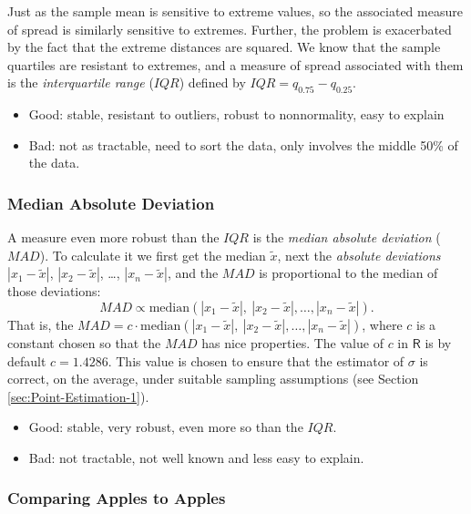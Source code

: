 \documentclass[captions=tableheading]{scrbook}
\begin{document}
Just as the sample mean is sensitive to extreme values, so the associated measure of spread is similarly sensitive to extremes. Further, the problem is exacerbated by the fact that the extreme distances are squared. We know that the sample quartiles are resistant to extremes, and a measure of spread associated with them is the \emph{interquartile range} (\(IQR\)) defined by \(IQR=q_{0.75}-q_{0.25}\).

\begin{itemize}
\item Good: stable, resistant to outliers, robust to nonnormality, easy to explain
\item Bad: not as tractable, need to sort the data, only involves the middle 50\% of the data.
\end{itemize}
\subsubsection{Median Absolute Deviation}
\label{sec-2-3-4-3}


A measure even more robust than the \(IQR\) is the \emph{median absolute deviation} (\(MAD\)). To calculate it we first get the median \(\widetilde{x}\), next the \emph{absolute deviations} \(|x_{1}-\tilde{x}|\), \(|x_{2}-\tilde{x}|\), \ldots{}, \(|x_{n}-\tilde{x}|\), and the \(MAD\) is proportional to the median of those deviations:
\begin{equation}
MAD\propto\mbox{median}(|x_{1}-\tilde{x}|,\ |x_{2}-\tilde{x}|,\ldots,|x_{n}-\tilde{x}|).
\end{equation}
That is, the \(MAD=c\cdot\mbox{median}(|x_{1}-\tilde{x}|,\ |x_{2}-\tilde{x}|,\ldots,|x_{n}-\tilde{x}|)\), where \(c\) is a constant chosen so that the \(MAD\) has nice properties. The value of \(c\) in \(\mathsf{R}\) is by default \(c=1.4286\). This value is chosen to ensure that the estimator of \(\sigma\) is correct, on the average, under suitable sampling assumptions (see Section \ref{sec:Point-Estimation-1}).
\begin{itemize}
\item Good: stable, very robust, even more so than the \(IQR\).
\item Bad: not tractable, not well known and less easy to explain.
\end{itemize}
\subsubsection{Comparing Apples to Apples}
\label{sec-2-3-4-4}
\end{document}
